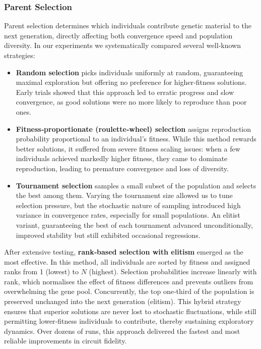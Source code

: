 \documentclass[11pt,a4paper]{article}
\begin{document}
\subsubsection*{Parent Selection}
Parent selection determines which individuals contribute genetic material to the next generation, directly affecting both convergence speed and population diversity. In our experiments we systematically compared several well‐known strategies:

\begin{itemize}
    \item \textbf{Random selection} picks individuals uniformly at random, guaranteeing maximal exploration but offering no preference for higher‐fitness solutions. Early trials showed that this approach led to erratic progress and slow convergence, as good solutions were no more likely to reproduce than poor ones.
    \item \textbf{Fitness‐proportionate (roulette‐wheel) selection} assigns reproduction probability proportional to an individual’s fitness. While this method rewards better solutions, it suffered from severe fitness scaling issues: when a few individuals achieved markedly higher fitness, they came to dominate reproduction, leading to premature convergence and loss of diversity.
    \item \textbf{Tournament selection} samples a small subset of the population and selects the best among them. Varying the tournament size allowed us to tune selection pressure, but the stochastic nature of sampling introduced high variance in convergence rates, especially for small populations. An elitist variant, guaranteeing the best of each tournament advanced unconditionally, improved stability but still exhibited occasional regressions.
\end{itemize}

After extensive testing, \textbf{rank‐based selection with elitism} emerged as the most effective. In this method, all individuals are sorted by fitness and assigned ranks from 1 (lowest) to $N$ (highest). Selection probabilities increase linearly with rank, which normalises the effect of fitness differences and prevents outliers from overwhelming the gene pool. Concurrently, the top one‐third of the population is preserved unchanged into the next generation (elitism). This hybrid strategy ensures that superior solutions are never lost to stochastic fluctuations, while still permitting lower‐fitness individuals to contribute, thereby sustaining exploratory dynamics. Over dozens of runs, this approach delivered the fastest and most reliable improvements in circuit fidelity.
\end{document}
